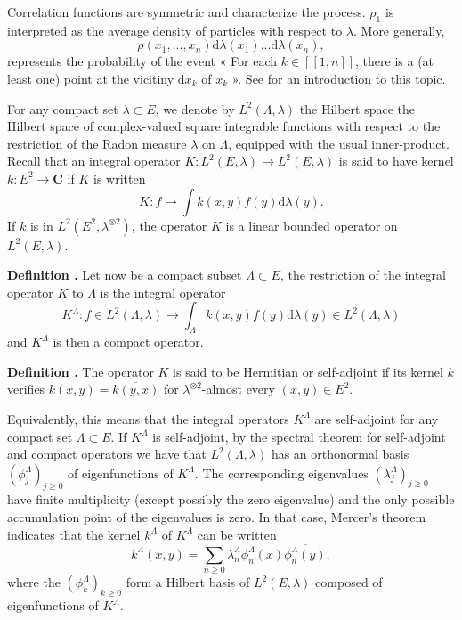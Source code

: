 \documentclass[11pt]{article}
\newcounter{cnt}
\newcommand{\cnt}{\thecnt \stepcounter{cnt}}
\begin{document}
Correlation functions are symmetric and characterize the process. $\rho_1$ is interpreted as the average density of particles with respect to $\lambda$. More generally, $$\rho (x_1, ..., x_n) \mathrm d \lambda (x_1) ... \mathrm d \lambda (x_n), $$ represents the probability of the event « For each $ k \in [ \! [1, n] \! ] $, there is a (at least one) point at the
vicitiny $ \mathrm d x_k $ of $ x_k $ ». See \cite{PPIntro2003} for an introduction to this topic.

For any compact set $ \lambda \subset E $, we denote by $ L^2(\Lambda, \lambda) $ the Hilbert space the Hilbert space of complex-valued square integrable functions with respect to the restriction of the Radon measure $ \lambda $ on $\Lambda $, equipped with the usual inner-product. Recall that an integral operator $ K : L^2(E, \lambda) \to L^2(E, \lambda)$ is said to have kernel $ k : E^2 \to \mathbf C $ if $K$ is written $$ K : f \mapsto  \int k(x, y) f(y) \mathrm d\lambda(y). $$ 
If $k$ is in $L^2(E^2, \lambda^{\otimes 2})$, the operator $K$ is a linear bounded operator on $ L^2(E, \lambda) $. 

\textbf{Definition \cnt.} Let now be a compact subset $ \Lambda \subset E $, the restriction of the integral operator $K$ to $\Lambda $ is the integral operator $$ K^\Lambda : f \in L^2(\Lambda, \lambda) \to \int_\Lambda k(x,y) f(y) \mathrm d \lambda (y) \in L^2(\Lambda, \lambda) $$ and $ K^\Lambda $ is then a compact operator.

\textbf{Definition \cnt.} The operator $K$ is said to be Hermitian or self-adjoint if its kernel $k$ verifies $ k(x, y) = \overline{k(y, x)}$ for $\lambda^{\otimes 2}$-almost every $(x, y) \in E^2$.

Equivalently, this means that the integral operators $K^\Lambda$ are self-adjoint for any compact set $\Lambda \subset E$. If $K^\Lambda$ is self-adjoint, by the spectral theorem for self-adjoint and compact operators we have that $L^2(\Lambda, \lambda)$ has an orthonormal basis $(\phi_j^\Lambda)_{j \ge 0}$ of eigenfunctions of $K^\Lambda$. The corresponding eigenvalues $(\lambda_j^\Lambda)_{j\geqslant 0}$ have finite multiplicity (except possibly the zero eigenvalue) and the only possible accumulation point of the eigenvalues is zero. In that case, Mercer's theorem indicates that the kernel $k^\Lambda$ of $K^\Lambda$ can be written $$ k^\Lambda(x, y) = \sum_{n \geqslant 0} \lambda_n^\Lambda \phi_n^\Lambda(x) \overline{\phi_n^\Lambda(y)}, $$ 
where the $(\phi_k^\Lambda)_{k \ge 0}$ form a Hilbert basis of $L^2(E, \lambda)$ composed of eigenfunctions of $K^\Lambda$.
\end{document}
